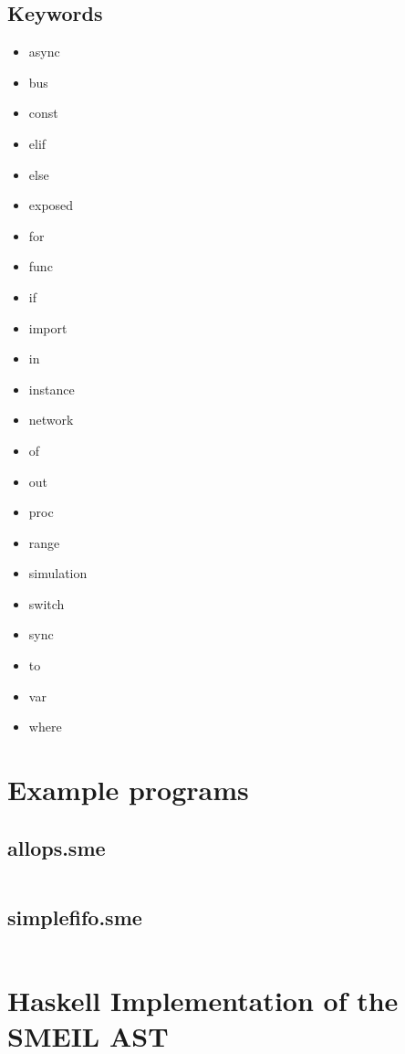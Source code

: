 \documentclass{article}
\begin{document}
\subsection{Keywords}
\begin{multicols}{3}
  \begin{itemize}
  \item async
  \item bus
  \item const
  \item elif
  \item else
  \item exposed
  \item for
  \item func
  \item if
  \item import
  \item in
  \item instance
  \item network
  \item of
  \item out
  \item proc
  \item range
  \item simulation
  \item switch
  \item sync
  \item to
  \item var
  \item where
  \end{itemize}
\end{multicols}

\section{Example programs}

\subsection{allops.sme}
\inputminted[fontsize=\small]{c}{samples/allops3.sme}

\subsection{simplefifo.sme}
\inputminted[fontsize=\small]{c}{samples/simplefifo.sme}

\newpage
\appendix
\section{Haskell Implementation of the SMEIL AST}
\label{hsast}
\inputminted[fontsize=\small]{haskell}{../../src/Language/SMEIL/Syntax.hs}
\end{document}
